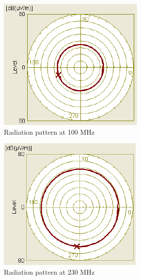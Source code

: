 \documentclass{pj}
\begin{document}
\begin{figure}[ht] 
	\begin{subfigure}[b]{0.5\linewidth}
		\centering
		\includegraphics[width=0.75\linewidth]{pattern_100_MHz.pdf} 
		\caption{Radiation pattern at 100 MHz} 
		\label{fig:rad_patt_100} 
		\vspace{4ex}
	\end{subfigure}%
	\begin{subfigure}[b]{0.5\linewidth}
		\centering
		\includegraphics[width=0.75\linewidth]{pattern_230_MHz.pdf} 
		\caption{Radiation pattern at 230 MHz} 
		\label{fig:rad_patt_230} 
		\vspace{4ex}
	\end{subfigure} 
	\begin{subfigure}[b]{0.5\linewidth}
		\centering

\end{subfigure}
\end{figure}
\end{document}
